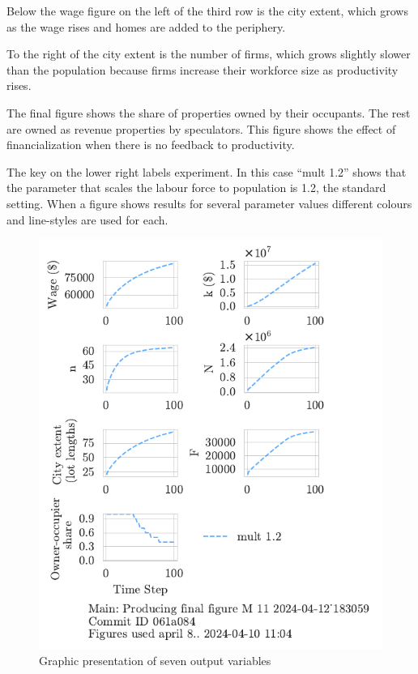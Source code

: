 Below the wage figure on the left of the third row is the city extent, which grows as the wage rises and homes are added to the periphery. 

To the right of the city extent is the number of firms, which grows slightly slower than the population because firms increase their workforce size as productivity rises.

The final figure shows the share of properties owned by their occupants. The rest are owned as revenue properties by speculators. This figure shows the effect of financialization when there is no feedback to productivity. 

The key on the lower right labels experiment. In this case ``mult 1.2'' shows that the parameter that scales the labour force to population is 1.2, the standard setting. When a figure shows results for several parameter values different colours and line-styles are used for each.


\begin{figure}[h!t]
\centering
\includegraphics[scale=1.0, trim={0 1.4cm 0 0},clip]{fig/plain-for-intro_183059.pdf}
\caption[Graphic presentation of seven output variables]{Graphic presentation of seven output variables}
\label{fig:plain-for-intro}
\end{figure}

